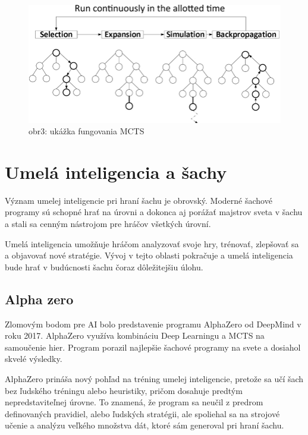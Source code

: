 \documentclass[10pt,twoside,slovak,a4paper]{article}
\begin{document}
\begin{figure}[h]
    \centering
    \includegraphics[width=\textwidth]{MCTS}
    \caption{obr3: ukážka fungovania MCTS}
    \label{obr3}
\end{figure}


\section{Umelá inteligencia a šachy} \label{AI}

Význam umelej inteligencie pri hraní šachu je obrovský. Moderné šachové programy sú schopné hrať na úrovni a dokonca aj porážať majstrov sveta v šachu a stali sa cenným nástrojom pre hráčov všetkých úrovní. 

Umelá inteligencia umožňuje hráčom analyzovať svoje hry, trénovať, zlepšovať sa a objavovať nové stratégie. Vývoj v tejto oblasti pokračuje a umelá inteligencia bude hrať v budúcnosti šachu čoraz dôležitejšiu úlohu.
\subsection{Alpha zero} \label{alphaZeroAI}

Zlomovým bodom pre AI bolo predstavenie programu AlphaZero od DeepMind v roku 2017. AlphaZero využíva kombináciu Deep Learningu a MCTS na samoučenie hier. Program porazil najlepšie šachové programy na svete a dosiahol skvelé výsledky.

AlphaZero prináša nový pohľad na tréning umelej inteligencie, pretože sa učí šach bez ľudského tréningu alebo heuristiky, pričom dosahuje predtým nepredstaviteľnej úrovne. To znamená, že program sa neučil z predrom definovaných pravidiel, alebo ľudských stratégii, ale spoliehal sa na strojové učenie a analýzu veľkého množstva dát, ktoré sám generoval pri hraní šachu.
\end{document}
